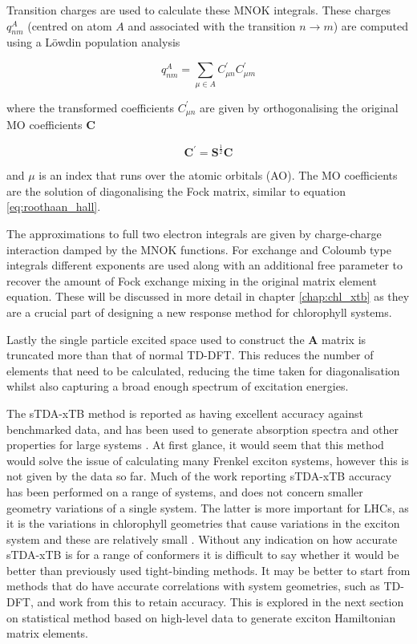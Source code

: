 Transition charges are used to calculate these MNOK integrals. These charges $q^A_{nm}$
(centred on atom $A$ and associated with the transition $ n \rightarrow m$) are
computed using a Löwdin population analysis

\begin{equation}
q_{nm}^A = \sum_{\mu \in A} C^\prime_{\mu n} C^\prime_{\mu m}
\end{equation}

where the transformed coefficients $C^\prime_{\mu n}$ are given by orthogonalising
the original MO coefficients $\textbf{C}$

\begin{equation}
\textbf{C}^\prime = \textbf{S}^{\frac{1}{2}} \textbf{C}
\end{equation}

and $\mu$ is an index that runs over the atomic orbitals (AO). The MO coefficients
are the solution of diagonalising the Fock matrix, similar to equation \ref{eq:roothaan_hall}.

The approximations to full two electron integrals are given by charge-charge interaction
damped by the MNOK functions. For exchange and Coloumb type integrals different 
exponents are used along with an additional free parameter to recover the amount 
of Fock exchange mixing in the original matrix element equation. These will be discussed
in more detail in chapter \ref{chap:chl_xtb} as they are a crucial part of designing 
a new response method for chlorophyll systems.

Lastly the single particle excited space used to construct the $\mathbf{A}$ matrix
is truncated more than that of normal TD-DFT. This reduces the number of elements
that need to be calculated, reducing the time taken for diagonalisation whilst also
capturing a broad enough spectrum of excitation energies. 

The sTDA-xTB method is reported as having excellent accuracy against benchmarked
data, and has been used to generate absorption spectra and other properties for 
large systems \cite{Grimme2016, Seibert2019, Wilbraham2018, Verma2022, HeathApostolopoulos2019}. 
At first glance, it would seem that this method would solve the issue of calculating 
many Frenkel exciton systems, however this is not given by the data so far. Much 
of the work reporting sTDA-xTB accuracy has been performed on a range of systems,
and does not concern smaller geometry variations of a single system. The latter
is more important for LHCs, as it is the variations in chlorophyll geometries that 
cause variations in the exciton system and these are relatively small \cite{Sirohiwal2020}.
Without any indication on how accurate sTDA-xTB is for a range of conformers it 
is difficult to say whether it would be better than previously used tight-binding 
methods. It may be better to start from methods that do have accurate correlations 
with system geometries, such as TD-DFT, and work from this to retain accuracy. This 
is explored in the next section on statistical method based on high-level data to 
generate exciton Hamiltonian matrix elements.

